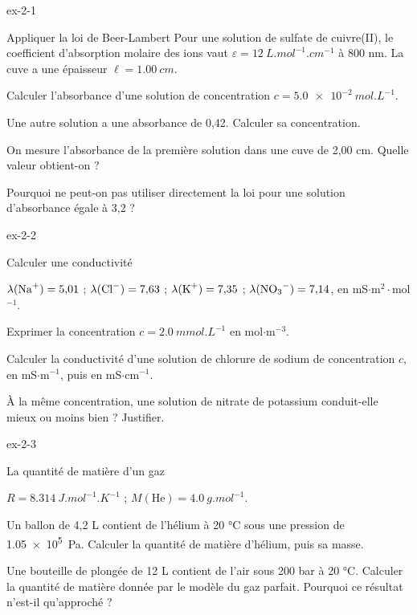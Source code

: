 \begin{blocLivre}{ex-2-1}
\begin{exercice}[1]{Appliquer la loi de Beer-Lambert}
Pour une solution de sulfate de cuivre(II), le coefficient d'absorption molaire des ions  vaut
$\varepsilon=\qty{12}{L.mol^{-1}.cm^{-1}}$ à 800 nm. La cuve a une épaisseur $\ell=\qty{1,00}{cm}$.
\begin{questions}
\item Calculer l'absorbance d'une solution de concentration $c=\qty{5,0e-2}{mol.L^{-1}}$.
\item Une autre solution a une absorbance de 0,42. Calculer sa concentration.
\item On mesure l'absorbance de la première solution dans une cuve de 2,00 cm. Quelle valeur obtient-on ?
\item Pourquoi ne peut-on pas utiliser directement la loi pour une solution d'absorbance égale à 3,2 ?
\end{questions}
\end{exercice}
\end{blocLivre}
\begin{blocLivre}{ex-2-2}
\begin{exercice}[1]{Calculer une conductivité}
\begin{donnees}
$\lambda(\ce{Na+})=5{,}01$ ; $\lambda(\ce{Cl-})=7{,}63$ ; $\lambda(\ce{K+})=7{,}35$ ; $\lambda(\ce{NO3-})=7{,}14$,
en mS$\cdot$m$^2\cdot$mol$^{-1}$.
\end{donnees}
\begin{questions}
\item Exprimer la concentration $c=\qty{2,0}{mmol.L^{-1}}$ en mol$\cdot$m$^{-3}$.
\item Calculer la conductivité d'une solution de chlorure de sodium de concentration $c$, en mS$\cdot$m$^{-1}$,
puis en mS$\cdot$cm$^{-1}$.
\item À la même concentration, une solution de nitrate de potassium conduit-elle mieux ou moins bien ? Justifier.
\end{questions}
\end{exercice}
\end{blocLivre}
\begin{blocLivre}{ex-2-3}
\begin{exercice}[1]{La quantité de matière d'un gaz}
\begin{donnees}
$R=\qty{8,314}{J.mol^{-1}.K^{-1}}$ ; $M(\mathrm{He})=\qty{4,0}{g.mol^{-1}}$.
\end{donnees}
\begin{questions}
\item Un ballon de 4,2 L contient de l'hélium à 20 °C sous une pression de \qty{1,05e5}{Pa}. Calculer la quantité
de matière d'hélium, puis sa masse.
\item Une bouteille de plongée de 12 L contient de l'air sous 200 bar à 20 °C. Calculer la quantité de matière
donnée par le modèle du gaz parfait. Pourquoi ce résultat n'est-il qu'approché ?
\end{questions}
\end{exercice}
\end{blocLivre}
